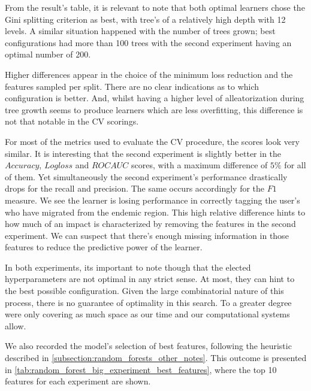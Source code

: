 From the result's table, it is relevant to note that both optimal learners chose the Gini splitting criterion as best, with tree's of a relatively high depth with 12 levels.
A similar situation happened with the number of trees grown; best configurations had more than 100 trees with the second experiment having an optimal number of 200.

Higher differences appear in the choice of the minimum loss reduction and the features sampled per split.
There are no clear indications as to which configuration is better.
And, whilst having a higher level of alleatorization during tree growth seems to produce learners which are less overfitting, this difference is not that notable in the CV scorings.

For most of the metrics used to evaluate the CV procedure, the scores look very similar.
It is interesting that the second experiment is slightly better in the $Accuracy$, $Logloss$ and $ROC AUC$ scores, with a maximum difference of $5\%$ for all of them.
Yet simultaneously the second experiment's performance drastically drops for the recall and precision.
The same occurs accordingly for the $F1$ measure.
We see the learner is losing performance in correctly tagging the user's who have migrated from the endemic region.
This high relative difference hints to how much of an impact is characterized by removing the features in the second experiment.
We can suspect that there's enough missing information in those features to reduce the predictive power of the learner.

In both experiments, its important to note though that the elected hyperparameters are not optimal in any strict sense.
At most, they can hint to the best possible configuration.
Given the large combinatorial nature of this process, there is no guarantee of optimality in this search.
To a greater degree were only covering as much space as our time and our computational systems allow.


We also recorded the model's selection of best features, following the heuristic described in \cref{subsection:random_forests_other_notes}.
This outcome is presented in \cref{tab:random_forest_big_experiment_best_features}, where the top 10 features for each experiment are shown.

